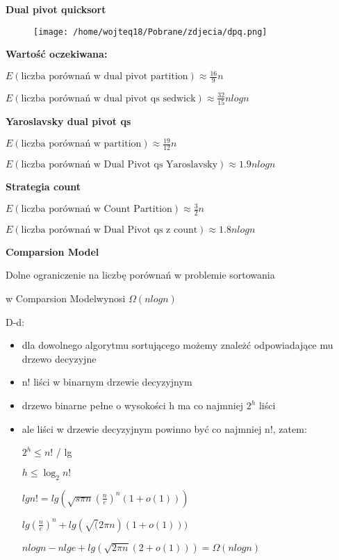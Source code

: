 \documentclass{article}
\begin{document}
    \textbf{Dual pivot quicksort} \newline

    \begin{figure}[H]
        \centering
        \texttt{[image: /home/wojteq18/Pobrane/zdjecia/dpq.png]}
        \label{fig:example_image}
    \end{figure}

    \textbf{Wartość oczekiwana: } 

    $E(\mbox{liczba porównań w dual pivot partition}) \approx \frac{16}{9}n$ 

    $E(\mbox{liczba porównań w dual pivot qs sedwick}) \approx \frac{32}{15}n logn$  \newline


    \textbf{Yaroslavsky dual pivot qs} 

    $E(\mbox{liczba porównań w partition}) \approx \frac{19}{12}n$ 

    $E(\mbox{liczba porównań w Dual Pivot qs Yaroslavsky}) \approx 1.9 n logn$ \newline

    \textbf{Strategia count}

    $E(\mbox{liczba porównań w Count Partition}) \approx \frac{3}{2}n$

    $E(\mbox{liczba porównań w Dual Pivot qs z count}) \approx 1.8 n logn$ \newline

    \textbf{Comparsion Model} 

    Dolne ograniczenie na liczbę porównań w problemie sortowania \par
    w Comparsion Modelwynosi $\Omega(n logn)$ \newline

    D-d: \par
    \begin{itemize}
        \item dla dowolnego algorytmu sortującego możemy znależć odpowiadające mu drzewo decyzyjne
        \item n! liści w binarnym drzewie decyzyjnym
        \item drzewo binarne pełne o wysokości h ma co najmniej $2^h$ liści
        \item ale liści w drzewie decyzyjnym powinno być co najmniej n!, zatem: \par
        $2^h \leq n!$ / lg \par
        $h \leq \log_{2}n!$ \par
        $lg n! = lg(\sqrt{s \pi n} (\frac{n}{e})^n (1 + o(1)))$ \par
        $lg (\frac{n}{e})^n + lg (\sqrt(2 \pi n)(1 + o(1)))$ \par
        $n logn - n lg e + lg(\sqrt{2 \pi n} (2 + o(1))) = \Omega(n logn)$
    \end{itemize}    \par
\end{document}
